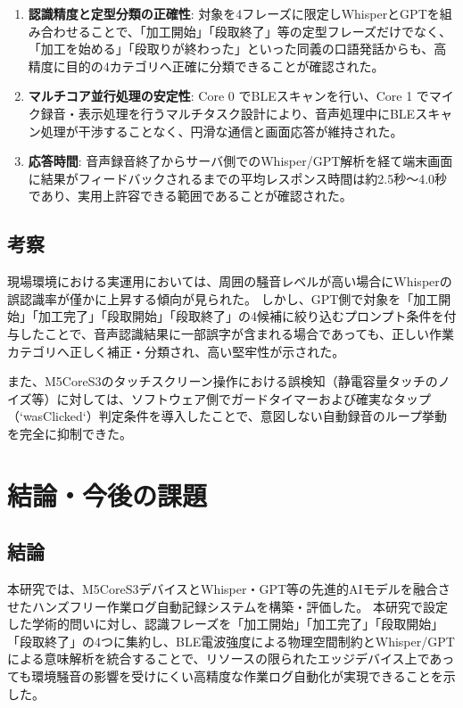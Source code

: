 \documentclass[a4paper,12pt,ja=standard,lualatex]{bxjsarticle}
\begin{document}
\begin{enumerate}
    \item \textbf{認識精度と定型分類の正確性}: 対象を4フレーズに限定しWhisperとGPTを組み合わせることで、「加工開始」「段取終了」等の定型フレーズだけでなく、「加工を始める」「段取りが終わった」といった同義の口語発話からも、高精度に目的の4カテゴリへ正確に分類できることが確認された。
    \item \textbf{マルチコア並行処理の安定性}: Core 0 でBLEスキャンを行い、Core 1 でマイク録音・表示処理を行うマルチタスク設計により、音声処理中にBLEスキャン処理が干渉することなく、円滑な通信と画面応答が維持された。
    \item \textbf{応答時間}: 音声録音終了からサーバ側でのWhisper/GPT解析を経て端末画面に結果がフィードバックされるまでの平均レスポンス時間は約2.5秒～4.0秒であり、実用上許容できる範囲であることが確認された。
\end{enumerate}

\subsection{考察}
現場環境における実運用においては、周囲の騒音レベルが高い場合にWhisperの誤認識率が僅かに上昇する傾向が見られた。
しかし、GPT側で対象を「加工開始」「加工完了」「段取開始」「段取終了」の4候補に絞り込むプロンプト条件を付与したことで、音声認識結果に一部誤字が含まれる場合であっても、正しい作業カテゴリへ正しく補正・分類され、高い堅牢性が示された。

また、M5CoreS3のタッチスクリーン操作における誤検知（静電容量タッチのノイズ等）に対しては、ソフトウェア側でガードタイマーおよび確実なタップ（`wasClicked`）判定条件を導入したことで、意図しない自動録音のループ挙動を完全に抑制できた。

\newpage

\section{結論・今後の課題}\label{sec5}

\subsection{結論}
本研究では、M5CoreS3デバイスとWhisper・GPT等の先進的AIモデルを融合させたハンズフリー作業ログ自動記録システムを構築・評価した。
本研究で設定した学術的問いに対し、認識フレーズを「加工開始」「加工完了」「段取開始」「段取終了」の4つに集約し、BLE電波強度による物理空間制約とWhisper/GPTによる意味解析を統合することで、リソースの限られたエッジデバイス上であっても環境騒音の影響を受けにくい高精度な作業ログ自動化が実現できることを示した。
\end{document}
